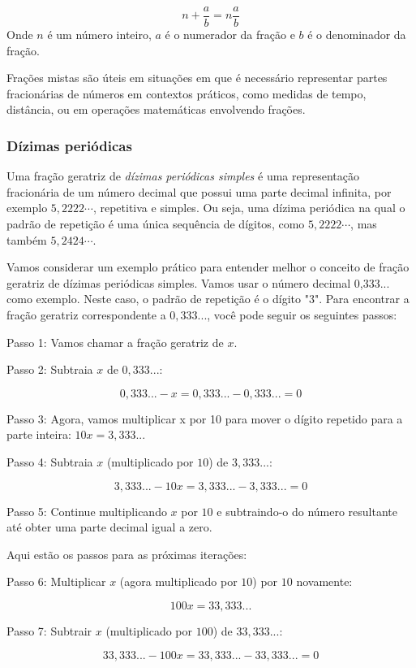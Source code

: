 {$$n + \frac{a}{b} = n \frac{a}{b}$$
Onde $n$ é um número inteiro, $a$ é o numerador da fração 
e $b$ é o denominador da fração.

Frações mistas são úteis em situações em que é necessário representar partes
fracionárias de números em contextos práticos, como medidas de tempo,
distância, ou em operações matemáticas envolvendo frações.

\subsubsection*{Dízimas periódicas}

Uma fração geratriz de \textit{dízimas periódicas simples} é uma representação
fracionária de um número decimal que possui uma parte decimal infinita, por
exemplo $5,2222\cdots$, repetitiva e simples. Ou seja, uma dízima periódica
na qual o padrão de repetição é uma única sequência de dígitos, como
$5,2222\cdots$, mas também $5,2424\cdots$.

Vamos considerar um exemplo prático para entender melhor o conceito de fração
geratriz de dízimas periódicas simples. Vamos usar o número decimal 0,333...
como exemplo. Neste caso, o padrão de repetição é o dígito "3". Para
encontrar a fração geratriz correspondente a $0,333...$, você pode seguir os
seguintes passos:

Passo 1: Vamos chamar a fração geratriz de $x$.

Passo 2: Subtraia $x$ de $0,333...$: 

$$0,333... - x = 0,333... - 0,333... = 0$$

Passo 3: Agora, vamos multiplicar x por 10 para mover o dígito repetido para a
parte inteira: $10x = 3,333...$

Passo 4: Subtraia $x$ (multiplicado por $10$) de $3,333...$: 

$$3,333... - 10x = 3,333... - 3,333... = 0$$

Passo 5: Continue multiplicando $x$ por $10$ e subtraindo-o do número resultante
até obter uma parte decimal igual a zero.

Aqui estão os passos para as próximas iterações:

Passo 6: Multiplicar $x$ (agora multiplicado por $10$) por $10$ novamente: 

$$100x = 33,333...$$

Passo 7: Subtrair $x$ (multiplicado por $100$) de $33,333...$: 

$$33,333... - 100x = 33,333... - 33,333... = 0$$

}
